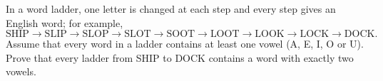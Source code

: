 In a word ladder, one letter is changed at each step and every step gives an English word; for example,
\[\text{SHIP}\to\text{SLIP}\to\text{SLOP}\to\text{SLOT}\to\text{SOOT}\to\text{LOOT}\to\text{LOOK}\to\text{LOCK}\to\text{DOCK}.\]
Assume that every word in a ladder contains at least one vowel (A, E, I, O or U). Prove that every ladder from SHIP to DOCK contains a word with exactly two vowels.

